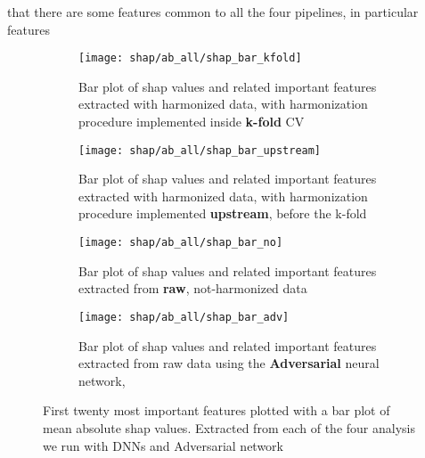 \documentclass[10pt]{report}
\begin{document}
 that there are some features common to all the four pipelines, in particular features




\begin{figure}[h!]
\centering
\begin{subfigure}[c]{.45\linewidth}
  \texttt{[image: shap/ab\_all/shap\_bar\_kfold]}
   \caption{Bar plot of shap values and related important features extracted with harmonized data, with harmonization procedure implemented inside \textbf{k-fold} CV}
   \label{fig:shap_bar_kfold_}
\end{subfigure}
\begin{subfigure}[c]{.45\textwidth}
   \texttt{[image: shap/ab\_all/shap\_bar\_upstream]}
   \caption{Bar plot of shap values and related important features extracted with harmonized data, with harmonization procedure implemented \textbf{upstream}, before the k-fold}
   \label{}
\end{subfigure}
\hspace{3mm}
\begin{subfigure}[c]{.45\textwidth}
   \texttt{[image: shap/ab\_all/shap\_bar\_no]}
   \caption{Bar plot of shap values and related important features extracted from \textbf{raw}, not-harmonized data}
   \label{}
\end{subfigure}
\begin{subfigure}[c]{.45\textwidth}
   \texttt{[image: shap/ab\_all/shap\_bar\_adv]}
   \caption{Bar plot of shap values and related important features extracted from raw data using the \textbf{Adversarial} neural network,}
   \label{}
\end{subfigure}
\caption{First twenty most important features plotted with a bar plot of mean absolute shap values. Extracted from each of the four analysis we run with DNNs and Adversarial network}
\label{fig:shap_abide_all}
\end{figure}
\end{document}

